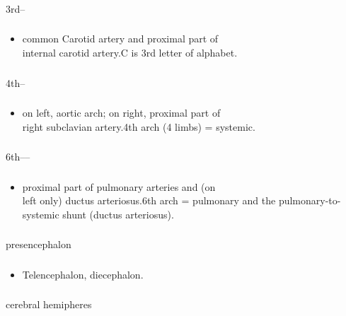 \documentclass[11pt]{beamer}
\begin{document}
\begin{frame}
 \frametitle{}
3rd–
\end{frame}

\begin{frame}
 \frametitle{}
\begin{itemize}
\item{common Carotid artery and proximal part of \\ internal carotid artery.C is 3rd letter of alphabet.}
\end{itemize}
\end{frame}

\begin{frame}
 \frametitle{}
4th–
\end{frame}

\begin{frame}
 \frametitle{}
\begin{itemize}
\item{on left, aortic arch; on right, proximal part of \\ right subclavian artery.4th arch (4 limbs) = systemic.}
\end{itemize}
\end{frame}

\begin{frame}
 \frametitle{}
6th––
\end{frame}

\begin{frame}
 \frametitle{}
\begin{itemize}
\item{proximal part of pulmonary arteries and (on \\ left only) ductus arteriosus.6th arch = pulmonary and the
pulmonary-to-systemic shunt (ductus arteriosus).}
\end{itemize}
\end{frame}

\begin{frame}
 \frametitle{}
presencephalon 
\end{frame}

\begin{frame}
 \frametitle{}
\begin{itemize}
\item{Telencephalon, diecephalon. }
\end{itemize}
\end{frame}

\begin{frame}
 \frametitle{}
cerebral hemipheres 
\end{frame}
\end{document}
